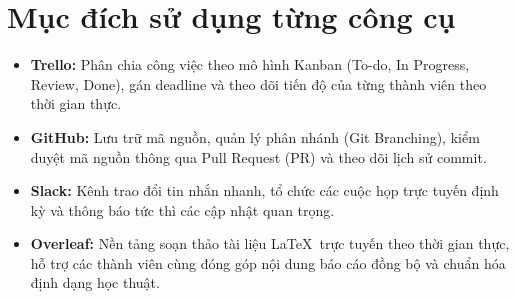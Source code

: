 \section{Mục đích sử dụng từng công cụ}

\begin{itemize}
    \item \textbf{Trello:} Phân chia công việc theo mô hình Kanban (To-do, In Progress, Review, Done), gán deadline và theo dõi tiến độ của từng thành viên theo thời gian thực.
    \item \textbf{GitHub:} Lưu trữ mã nguồn, quản lý phân nhánh (Git Branching), kiểm duyệt mã nguồn thông qua Pull Request (PR) và theo dõi lịch sử commit.
    \item \textbf{Slack:} Kênh trao đổi tin nhắn nhanh, tổ chức các cuộc họp trực tuyến định kỳ và thông báo tức thì các cập nhật quan trọng.
    \item \textbf{Overleaf:} Nền tảng soạn thảo tài liệu \LaTeX\ trực tuyến theo thời gian thực, hỗ trợ các thành viên cùng đóng góp nội dung báo cáo đồng bộ và chuẩn hóa định dạng học thuật.
\end{itemize}
